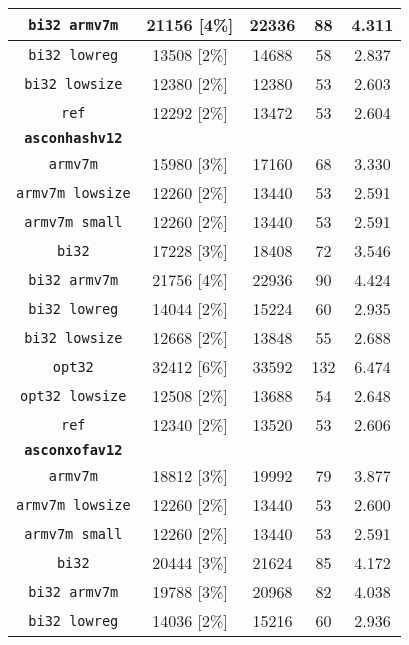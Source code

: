 \begin{table}[h]
\begin{adjustbox}{width=205pt}
\begin{tabular}{|c|c|c|c|c|}
        \hline
        \texttt{bi32 armv7m} & 21156 [4\%] & 22336 & 88 & 4.311 \\
        \hline
        \texttt{bi32 lowreg} & 13508 [2\%] & 14688 & 58 & 2.837 \\
        \hline
        \texttt{bi32 lowsize} & 12380 [2\%] & 12380 & 53 & 2.603 \\
        \hline
        \texttt{ref} & 12292 [2\%] & 13472 & 53 & 2.604 \\
        \hline
        \texttt{\textbf{asconhashv12}} & & & & \\
        \hline
        \texttt{armv7m} & 15980 [3\%] & 17160 & 68 & 3.330 \\
        \hline
        \texttt{armv7m lowsize} & 12260 [2\%] & 13440 & 53 & 2.591 \\
        \hline
        \texttt{armv7m small} & 12260 [2\%] & 13440 & 53 & 2.591 \\
        \hline
        \texttt{bi32} & 17228 [3\%] & 18408 & 72 & 3.546 \\
        \hline
        \texttt{bi32 armv7m} & 21756 [4\%] & 22936 & 90 & 4.424 \\
        \hline
        \texttt{bi32 lowreg} & 14044 [2\%] & 15224 & 60 & 2.935 \\
        \hline
        \texttt{bi32 lowsize} & 12668 [2\%] & 13848 & 55 & 2.688 \\
        \hline
        \texttt{opt32} & 32412 [6\%] & 33592 & 132 & 6.474 \\
        \hline
        \texttt{opt32 lowsize} & 12508 [2\%] & 13688 & 54 & 2.648 \\
        \hline
        \texttt{ref} & 12340 [2\%] & 13520 & 53 & 2.606 \\
        \hline
        \texttt{\textbf{asconxofav12}} & & & & \\
        \hline
        \texttt{armv7m} & 18812 [3\%] & 19992 & 79 & 3.877 \\
        \hline
        \texttt{armv7m lowsize} & 12260 [2\%] & 13440 & 53 & 2.600 \\
        \hline
        \texttt{armv7m small} & 12260 [2\%] & 13440 & 53 & 2.591 \\
        \hline
        \texttt{bi32} & 20444 [3\%] & 21624 & 85 & 4.172 \\
        \hline
        \texttt{bi32 armv7m} & 19788 [3\%] & 20968 & 82 & 4.038 \\
        \hline
        \texttt{bi32 lowreg} & 14036 [2\%] & 15216 & 60 & 2.936 \\

\end{tabular}
\end{adjustbox}
\end{table}
